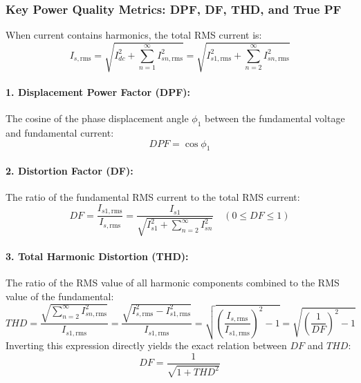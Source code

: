 \subsubsection{Key Power Quality Metrics: DPF, DF, THD, and True PF}
When current contains harmonics, the total RMS current is:
\begin{equation}
I_{s,\mathrm{rms}} = \sqrt{I_{dc}^2 + \sum_{n=1}^\infty I_{sn,\mathrm{rms}}^2} = \sqrt{I_{s1,\mathrm{rms}}^2 + \sum_{n=2}^\infty I_{sn,\mathrm{rms}}^2}
\end{equation}

\paragraph{1. Displacement Power Factor (DPF):}
The cosine of the phase displacement angle $\phi_1$ between the fundamental voltage and fundamental current:
\begin{equation}
DPF = \cos\phi_1
\end{equation}

\paragraph{2. Distortion Factor (DF):}
The ratio of the fundamental RMS current to the total RMS current:
\begin{equation}
DF = \frac{I_{s1,\mathrm{rms}}}{I_{s,\mathrm{rms}}} = \frac{I_{s1}}{\sqrt{I_{s1}^2 + \sum_{n=2}^\infty I_{sn}^2}} \quad (0 \le DF \le 1)
\end{equation}

\paragraph{3. Total Harmonic Distortion (THD):}
The ratio of the RMS value of all harmonic components combined to the RMS value of the fundamental:
\begin{equation}
THD = \frac{\sqrt{\sum_{n=2}^\infty I_{sn,\mathrm{rms}}^2}}{I_{s1,\mathrm{rms}}} = \frac{\sqrt{I_{s,\mathrm{rms}}^2 - I_{s1,\mathrm{rms}}^2}}{I_{s1,\mathrm{rms}}} = \sqrt{\left(\frac{I_{s,\mathrm{rms}}}{I_{s1,\mathrm{rms}}}\right)^2 - 1} = \sqrt{\left(\frac{1}{DF}\right)^2 - 1}
\end{equation}
Inverting this expression directly yields the exact relation between $DF$ and $THD$:
\begin{equation}
DF = \frac{1}{\sqrt{1 + THD^2}}
\end{equation}

